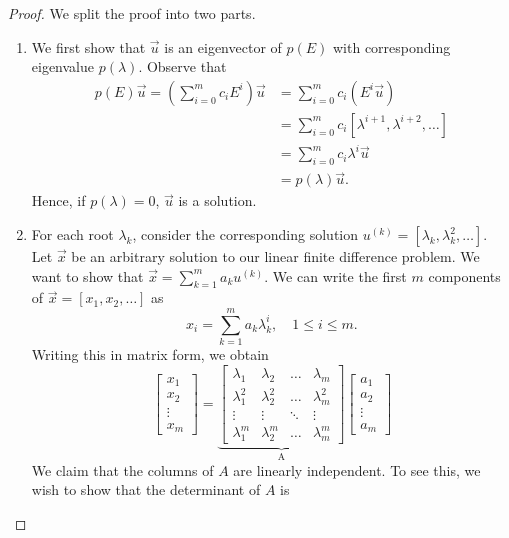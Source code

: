 \documentclass[12pt,reqno]{amsart}
\numberwithin{equation}{section}  %
\begin{document}
\begin{proof} We split the proof into two parts.
\begin{enumerate}
  \item 
  We first show that $\vec{u}$ is an eigenvector of $p(E)$ with corresponding
  eigenvalue $p(\lambda)$. Observe that
  \begin{align*}
p(E) \vec{u} = \left(\sum_{i=0}^m c_i E^i \right) \vec{u}
& = \sum_{ i = 0}^m c_i \left( E^i \vec{u}\right)
\\
& = \sum_{i = 0}^m c_i [\lambda^{i+1}, \lambda^{i+2}, \ldots]
\\
& = \sum_{i = 0}^m c_i \lambda^i \vec{u}
\\
& = p(\lambda) \vec{u}.	 
\end{align*}
Hence, if $p(\lambda) = 0$, $\vec{u}$ is a solution.
\item
For each root $\lambda_k$, consider the corresponding solution $u^{(k)} =
[\lambda_k, \lambda_k^2, \ldots]$. Let $\vec{x}$ be an arbitrary solution to our
linear finite difference problem. We want to show that $\vec{x} = \sum_{k=1}^m
a_k u^{(k)}$. We can write
the first $m$ components of $\vec{x} = [x_1, x_2, \ldots]$ as 
\begin{equation}
\label{det}
x_i = \sum_{k=1}^{m} a_k \lambda_k^i, \quad 1 \le i \le m.
\end{equation}
Writing this in matrix form, we obtain
\begin{equation*}
\begin{bmatrix}
x_1 \\ x_2 \\ \vdots \\ x_m
\end{bmatrix}
= 
\underbrace{
\begin{bmatrix}
\lambda_1 & \lambda_2 & \ldots & \lambda_m \\
\lambda_1^2 & \lambda_2^2 & \ldots & \lambda_m^2 \\
\vdots & \vdots & \ddots & \vdots \\
\lambda_1^m & \lambda_2^m & \ldots & \lambda_m^m 
\end{bmatrix}
}_\text{A}
\begin{bmatrix}
a_1 \\ a_2 \\ \vdots \\ a_m
\end{bmatrix}
\end{equation*}
We claim that the columns of $A$ are linearly
independent. To see this, we wish to show that the determinant of $A$ is

\end{enumerate}
\end{proof}
\end{document}
